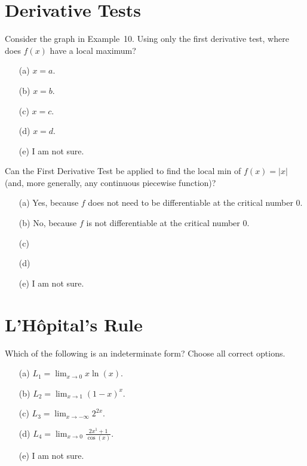 \documentclass[14pt]{beamer}
\begin{document}
\section{Derivative Tests}

\begin{frame}[t]
  Consider the graph in Example~10. Using only the first derivative test, where does \(f(x)\) have a local maximum? 

  \medskip
  \begin{itemize} \setlength\itemsep{1ex}
    \item[(a)] \(x = a\). 
    \item[(b)] \(x = b\). 
    \item[(c)] \(x = c\).
    \item[(d)] \(x = d\). 
    \item[(e)] I am not sure.
  \end{itemize} 
\end{frame}

\begin{frame}[t]
  Can the First Derivative Test be applied to find the local min of \(f(x) = |x|\) (and, more generally, any continuous piecewise function)? 

  \medskip
  \begin{itemize} \setlength\itemsep{1ex}
    \item[(a)] Yes, because \(f\) does not need to be differentiable at the critical number \(0\).
    \item[(b)] No, because \(f\) is not differentiable at the critical number \(0\).
    \item[(c)] 
    \item[(d)] 
    \item[(e)] I am not sure.
  \end{itemize} 
\end{frame}

\section{L'H\^opital's Rule}
\begin{frame}[t]
  Which of the following is an indeterminate form? Choose all correct options.

  \medskip
  \begin{itemize} \setlength\itemsep{1ex}
    \item[(a)] \(L_{1} = \lim_{x \to 0} x \ln(x)\).
    \item[(b)] \(L_{2} = \lim_{x \to 1} (1 - x)^{x}\).
    \item[(c)] \(L_{3} = \lim_{x \to -\infty} 2^{2x}\).
    \item[(d)] \(L_{4} = \lim_{x \to 0} \frac{2x^{1}+1}{\cos(x)}\).
    \item[(e)] I am not sure.
  \end{itemize} 
\end{frame}
\end{document}
